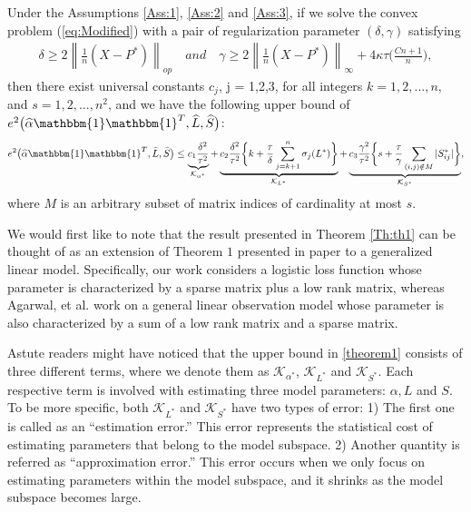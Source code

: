 \documentclass[AMS,STIX1COL]{WileyNJD-v2}
\begin{document}
{\begin{theorem} \label{Th:th1}
Under the Assumptions \ref{Ass:1}, \ref{Ass:2} and \ref{Ass:3},
if we solve the convex problem (\ref{eq:Modified}) with a pair of regularization parameter $(\delta,\gamma)$ satisfying
\begin{align} \label{eq:49}
\delta \geq 2 \left\|\frac{1}{n}(X-P^{*}) \right\|_{op} \quad and \quad \gamma \geq 2\left\|\frac{1}{n}(X-P^{*})\right\|_{\infty}+4\kappa\tau\bigg(\frac{Cn+1}{n} \bigg),
\end{align}
then there exist universal constants $c_{j}$, j = 1,2,3,  for all integers $k = 1,2,...,n$, and $s = 1,2,...,n^{2}$, and we have the following upper bound of $e^{2}\big(\widehat{\alpha}\mathbbm{1}\mathbbm{1}^T,\widehat{L},\widehat{S}\big)$: 
\begin{align} \label{theorem1}
    e^{2}\big(\widehat{\alpha}\mathbbm{1}\mathbbm{1}^T,\widehat{L},\widehat{S}\big) \leq
    \underbrace{c_{1}\frac{\delta^{2}}{\tau^{2}}}
    _{\mathcal{K}_{\alpha^*}} +
    \underbrace{c_{2}\frac{\delta^{2}}{\tau^{2}}
    \bigg\{k + \frac{\tau}{\delta}\sum_{j=k+1}^{n}\sigma_{j}(L^{*})\bigg\}}_{\mathcal{K}_{L^*}} +
    \underbrace{c_{3}\frac{\gamma^{2}}{\tau^{2}}
    \bigg\{s + \frac{\tau}{\gamma}\sum_{(i,j) \notin M}|S^*_{ij}|\bigg\}}_{\mathcal{K}_{S^*}},
\end{align}
where $M$ is an arbitrary subset of matrix indices of cardinality at most $s$.
\end{theorem}

We would first like to note that the result presented in Theorem \ref{Th:th1} can be thought of as an extension of Theorem $1$ presented in paper \cite{agarwal2012noisy} to a generalized linear model.
Specifically, our work considers a logistic loss function whose parameter is characterized by a sparse matrix plus a low rank matrix,
whereas Agarwal, et al. \cite{agarwal2012noisy} work on a general linear observation model whose parameter is also
characterized by a sum of a low rank matrix and a sparse matrix.


Astute readers might have noticed that the upper bound in \eqref{theorem1} consists of three different terms, where we denote them as
$\mathcal{K}_{\alpha^*}$, $\mathcal{K}_{L^*}$ and $\mathcal{K}_{S^*}$.
Each respective term is involved with estimating three model parameters: $\alpha, L$ and $S$.
To be more specific, both $\mathcal{K}_{L^*}$ and $\mathcal{K}_{S^*}$ have two types of error:
1) The first one is called as an ``estimation error.''
This error represents the statistical cost of estimating parameters that belong to the model subspace.
2) Another quantity is referred as ``approximation error.''
This error occurs when we only focus on estimating parameters within the model subspace,
and it shrinks as the model subspace becomes large.

}
\end{document}
